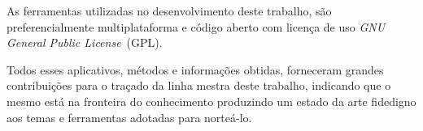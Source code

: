   As ferramentas utilizadas no desenvolvimento deste trabalho, são preferencialmente multiplataforma e código aberto com licença de uso \emph{GNU General Public License}~(GPL).

  Todos esses aplicativos, métodos e informações obtidas, forneceram grandes contribuições para o traçado da linha mestra deste trabalho, indicando que o mesmo está na fronteira do conhecimento produzindo um estado da arte fidedigno aos temas e ferramentas adotadas para norteá-lo.

\begin{center}
\end{center}
